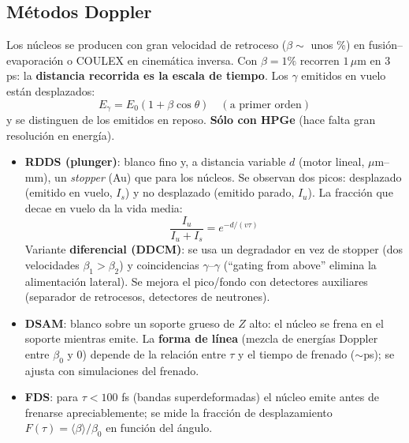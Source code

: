 \subsection{Métodos Doppler}
\begin{clave}[Principio]
Los núcleos se producen con gran velocidad de retroceso ($\beta\sim$ unos \%) en fusión--evaporación o COULEX en cinemática inversa.
Con $\beta=1\%$ recorren $1\,\mu$m en 3 ps: la \textbf{distancia recorrida es la escala de tiempo}. Los $\gamma$ emitidos en vuelo están desplazados:
\[ E_\gamma=E_0\left(1+\beta\cos\theta\right)\quad(\text{a primer orden}) \]
y se distinguen de los emitidos en reposo. \textbf{Sólo con HPGe} (hace falta gran resolución en energía).
\end{clave}
\begin{itemize}
\item \textbf{RDDS (plunger)}: blanco fino y, a distancia variable $d$ (motor lineal, $\mu$m--mm), un \emph{stopper} (Au) que para los núcleos. Se observan dos picos:
desplazado (emitido en vuelo, $I_s$) y no desplazado (emitido parado, $I_u$). La fracción que decae en vuelo da la vida media:
\[ \frac{I_u}{I_u+I_s}=e^{-d/(v\tau)} \]
Variante \textbf{diferencial (DDCM)}: se usa un degradador en vez de stopper (dos velocidades $\beta_1>\beta_2$) y coincidencias $\gamma$--$\gamma$
(``gating from above'' elimina la alimentación lateral). Se mejora el pico/fondo con detectores auxiliares (separador de retrocesos, detectores de neutrones).
\item \textbf{DSAM}: blanco sobre un soporte grueso de $Z$ alto: el núcleo se frena en el soporte mientras emite. La \textbf{forma de línea} (mezcla de
energías Doppler entre $\beta_0$ y 0) depende de la relación entre $\tau$ y el tiempo de frenado ($\sim$ps); se ajusta con simulaciones del frenado.
\item \textbf{FDS}: para $\tau<100$ fs (bandas superdeformadas) el núcleo emite antes de frenarse apreciablemente; se mide la fracción de desplazamiento
$F(\tau)=\langle\beta\rangle/\beta_0$ en función del ángulo.
\end{itemize}

